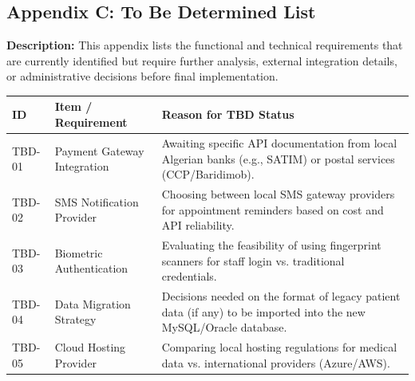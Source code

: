 \subsection{Appendix C: To Be Determined List}
\textbf{Description:} This appendix lists the functional and technical requirements that are currently identified but require further analysis, external integration details, or administrative decisions before final implementation.
\begin{table}[H]
	\centering
	\renewcommand{\arraystretch}{1.4}
	\begin{tabularx}{\textwidth}{l X X}
		\toprule
		\textbf{ID} & \textbf{Item / Requirement} & \textbf{Reason for TBD Status} \\
		\midrule
		TBD-01 & Payment Gateway Integration & Awaiting specific API documentation from local Algerian banks (e.g., SATIM) or postal services (CCP/Baridimob). \\ \addlinespace
		TBD-02 & SMS Notification Provider & Choosing between local SMS gateway providers for appointment reminders based on cost and API reliability. \\ \addlinespace
		TBD-03 & Biometric Authentication & Evaluating the feasibility of using fingerprint scanners for staff login vs. traditional credentials. \\ \addlinespace
		TBD-04 & Data Migration Strategy & Decisions needed on the format of legacy patient data (if any) to be imported into the new MySQL/Oracle database. \\ \addlinespace
		TBD-05 & Cloud Hosting Provider & Comparing local hosting regulations for medical data vs. international providers (Azure/AWS). \\
		\bottomrule
	\end{tabularx}
\end{table}